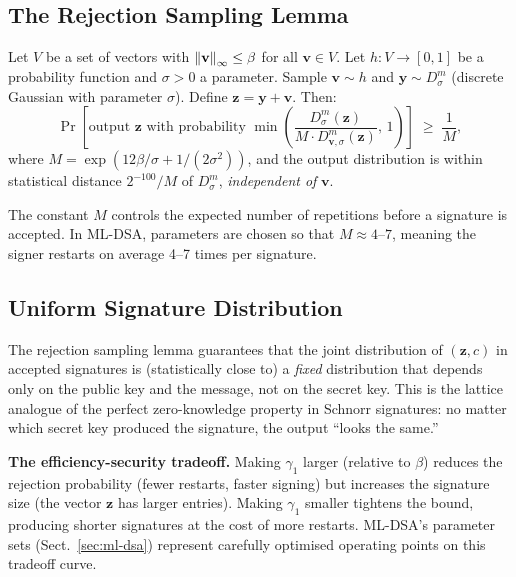\subsection{The Rejection Sampling Lemma}
\label{subsec:rejection-lemma}

\begin{theorem}
\label{thm:rejection-sampling}
Let $V$ be a set of vectors with $\left\lVert \mathbf{v} \right\rVert_\infty \leq \beta$ for all $\mathbf{v} \in V$.  Let $h: V \to [0,1]$ be a probability function and $\sigma > 0$ a parameter.  Sample $\mathbf{v} \sim h$ and $\mathbf{y} \sim D_\sigma^m$ (discrete Gaussian with parameter $\sigma$).  Define $\mathbf{z} = \mathbf{y} + \mathbf{v}$.  Then:
\begin{equation}
\label{eq:rejection-sampling}
\Pr\!\left[\text{output } \mathbf{z} \text{ with probability } \min\!\left(\frac{D_\sigma^m(\mathbf{z})}{M \cdot D_{\mathbf{v},\sigma}^m(\mathbf{z})},\, 1\right)\right]
\;\geq\; \frac{1}{M},
\end{equation}
where $M = \exp(12\beta/\sigma + 1/(2\sigma^2))$, and the output distribution is within statistical distance $2^{-100}/M$ of $D_\sigma^m$, \emph{independent of} $\mathbf{v}$.
\end{theorem}

The constant $M$ controls the expected number of repetitions before a signature is accepted.  In ML-DSA, parameters are chosen so that $M \approx 4$--$7$, meaning the signer restarts on average 4--7 times per signature.

\subsection{Uniform Signature Distribution}
\label{subsec:uniform-sigs}

The rejection sampling lemma guarantees that the joint distribution of $(\mathbf{z}, c)$ in accepted signatures is (statistically close to) a \emph{fixed} distribution that depends only on the public key and the message, not on the secret key.  This is the lattice analogue of the perfect zero-knowledge property in Schnorr signatures: no matter which secret key produced the signature, the output ``looks the same.''

\begin{svgraybox}
\textbf{The efficiency-security tradeoff.}  Making $\gamma_1$ larger (relative to $\beta$) reduces the rejection probability (fewer restarts, faster signing) but increases the signature size (the vector $\mathbf{z}$ has larger entries).  Making $\gamma_1$ smaller tightens the bound, producing shorter signatures at the cost of more restarts.  ML-DSA's parameter sets (Sect.~\ref{sec:ml-dsa}) represent carefully optimised operating points on this tradeoff curve.
\end{svgraybox}

